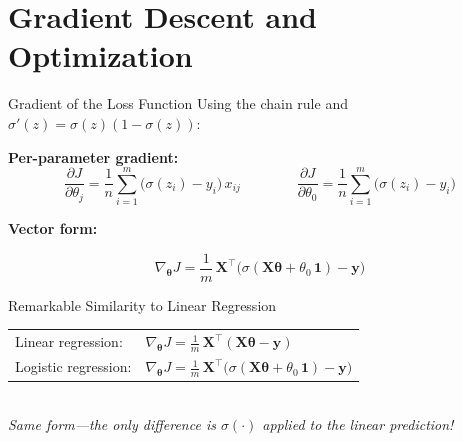\documentclass[aspectratio=169,11pt]{beamer}
\begin{document}
\section{Gradient Descent and Optimization}

\begin{frame}{Gradient of the Loss Function}
Using the chain rule and $\sigma'(z)=\sigma(z)(1-\sigma(z))$:

\vspace{0.5em}
\textbf{Per-parameter gradient:}
\[
  \frac{\partial J}{\partial \theta_j} = \frac{1}{n}\sum_{i=1}^{m}\bigl(\sigma(z_i)-y_i\bigr)\,x_{ij}
  \qquad\qquad
  \frac{\partial J}{\partial \theta_0} = \frac{1}{n}\sum_{i=1}^{m}\bigl(\sigma(z_i)-y_i\bigr)
\]

\textbf{Vector form:}
\begin{block}{}
\vspace{-0.8em}
\[
  \boxed{\nabla_{\boldsymbol{\theta}} J = \frac{1}{m}\,\mathbf{X}^\top\!\bigl(\sigma(\mathbf{X}\boldsymbol{\theta}+\theta_0\,\boldsymbol{1})-\boldsymbol{y}\bigr)}
\]
\vspace{-0.8em}
\end{block}

\vspace{0.5em}
\begin{exampleblock}{Remarkable Similarity to Linear Regression}
\begin{tabular}{ll}
  Linear regression: & $\nabla_{\boldsymbol{\theta}} J = \frac{1}{m}\,\mathbf{X}^\top(\mathbf{X}\boldsymbol{\theta}-\boldsymbol{y})$ \\[0.5em]
  Logistic regression: & $\nabla_{\boldsymbol{\theta}} J = \frac{1}{m}\,\mathbf{X}^\top\bigl(\sigma(\mathbf{X}\boldsymbol{\theta}+\theta_0\,\boldsymbol{1})-\boldsymbol{y}\bigr)$
\end{tabular}
\smallskip\\
\textit{Same form---the only difference is $\sigma(\cdot)$ applied to the linear prediction!}
\end{exampleblock}
\end{frame}
\end{document}
